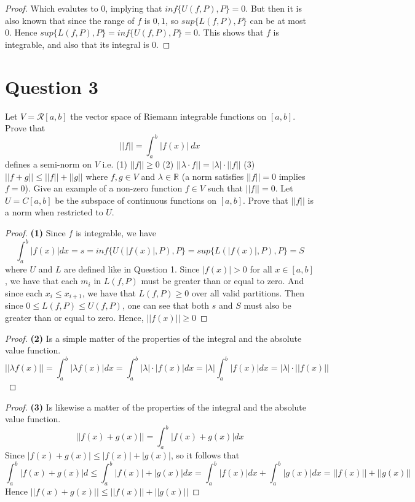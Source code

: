\documentclass[12pt, letterpaper]{article}
\begin{document}
\begin{proof}
  Which evalutes to 0, implying that $inf\{U(f,P),P\} = 0$. But then it is also known that since the range of $f$ is $0, 1$, so $sup\{L(f,P),P\}$ can be at most 0. Hence $sup\{L(f,P),P\} = inf\{U(f,P),P\} = 0$. This shows that $f$ is integrable, and also that its integral is 0.

\end{proof}

\section*{Question 3}
Let $V=\mathcal R[a,b]$ the vector space of Riemann integrable functions on $[a,b]$. Prove that
\[
||f||=\int_a^b |f(x)| ~dx
\]
defines a semi-norm on $V$ i.e. (1)  $||f||\geq 0$ (2) $||\lambda \cdot f || = |\lambda |\cdot ||f||$ (3) $||f + g|| \leq ||f|| + ||g||$ where $f,g\in V$ and
$\lambda \in \mathbb R$ (a norm satisfies $||f||=0$ implies $f=0$). Give an example of a non-zero function $f\in V$ such that $||f||=0$.
Let $U=C[a,b]$ be the subspace of continuous functions on $[a,b]$. Prove that $||f||$ is a norm when restricted to $U$.
\begin{proof}
  \textbf{(1)} Since $f$ is integrable, we have
  $$\int_{a}^{b} |f(x)|dx = s = inf \{U(|f(x)|, P), P\} = sup \{L(|f(x)|, P), P\} = S$$
   where $U$ and $L$ are defined like in Question 1. Since $|f(x)| > 0$ for all $x \in [a, b]$, we have that each $m_i$ in $L(f, P)$ must be greater
  than or equal to zero. And since each $x_i \leq x_{i+1}$, we have that $L(f, P) \geq 0$ over all valid partitions. Then since $0 \leq L(f, P) \leq U(f, P)$, one can see that both $s$ and $S$ must also be greater than or equal to zero.
  Hence, $||f(x)|| \geq 0$
\end{proof}
\begin{proof}
  \textbf{(2)} Is a simple matter of the properties of the integral and the absolute value function.
  $$ ||\lambda f(x)|| = \int_{a}^{b} |\lambda f(x)|dx = \int_{a}^{b} |\lambda| \cdot |f(x)|dx = |\lambda|\int_{a}^{b}|f(x)|dx = |\lambda| \cdot ||f(x)|| $$
\end{proof}
\begin{proof}
  \textbf{(3)} Is likewise a matter of the properties of the integral and the absolute value function.
  $$ ||f(x) + g(x)|| = \int_{a}^{b}|f(x) + g(x)|dx$$
  Since $|f(x) + g(x)| \leq |f(x)| + |g(x)|$, so it follows that
  $$ \int_{a}^{b}|f(x) + g(x)|d \leq \int_{a}^{b}|f(x)| + |g(x)|dx = \int_{a}^{b}|f(x)|dx + \int_{a}^{b}|g(x)|dx =||f(x)|| + ||g(x)||$$
  Hence $||f(x) + g(x)|| \leq ||f(x)|| + ||g(x)||$
\end{proof}
\end{document}
